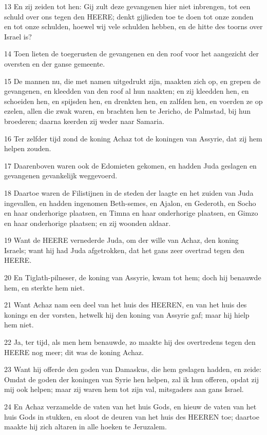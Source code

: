 \par 13 En zij zeiden tot hen: Gij zult deze gevangenen hier niet inbrengen, tot een schuld over ons tegen den HEERE; denkt gijlieden toe te doen tot onze zonden en tot onze schulden, hoewel wij vele schulden hebben, en de hitte des toorns over Israel is?
\par 14 Toen lieten de toegerusten de gevangenen en den roof voor het aangezicht der oversten en der ganse gemeente.
\par 15 De mannen nu, die met namen uitgedrukt zijn, maakten zich op, en grepen de gevangenen, en kleedden van den roof al hun naakten; en zij kleedden hen, en schoeiden hen, en spijsden hen, en drenkten hen, en zalfden hen, en voerden ze op ezelen, allen die zwak waren, en brachten hen te Jericho, de Palmstad, bij hun broederen; daarna keerden zij weder naar Samaria.
\par 16 Ter zelfder tijd zond de koning Achaz tot de koningen van Assyrie, dat zij hem helpen zouden.
\par 17 Daarenboven waren ook de Edomieten gekomen, en hadden Juda geslagen en gevangenen gevankelijk weggevoerd.
\par 18 Daartoe waren de Filistijnen in de steden der laagte en het zuiden van Juda ingevallen, en hadden ingenomen Beth-semes, en Ajalon, en Gederoth, en Socho en haar onderhorige plaatsen, en Timna en haar onderhorige plaatsen, en Gimzo en haar onderhorige plaatsen; en zij woonden aldaar.
\par 19 Want de HEERE vernederde Juda, om der wille van Achaz, den koning Israels; want hij had Juda afgetrokken, dat het gans zeer overtrad tegen den HEERE.
\par 20 En Tiglath-pilneser, de koning van Assyrie, kwam tot hem; doch hij benauwde hem, en sterkte hem niet.
\par 21 Want Achaz nam een deel van het huis des HEEREN, en van het huis des konings en der vorsten, hetwelk hij den koning van Assyrie gaf; maar hij hielp hem niet.
\par 22 Ja, ter tijd, als men hem benauwde, zo maakte hij des overtredens tegen den HEERE nog meer; dit was de koning Achaz.
\par 23 Want hij offerde den goden van Damaskus, die hem geslagen hadden, en zeide: Omdat de goden der koningen van Syrie hen helpen, zal ik hun offeren, opdat zij mij ook helpen; maar zij waren hem tot zijn val, mitsgaders aan gans Israel.
\par 24 En Achaz verzamelde de vaten van het huis Gods, en hieuw de vaten van het huis Gods in stukken, en sloot de deuren van het huis des HEEREN toe; daartoe maakte hij zich altaren in alle hoeken te Jeruzalem.
